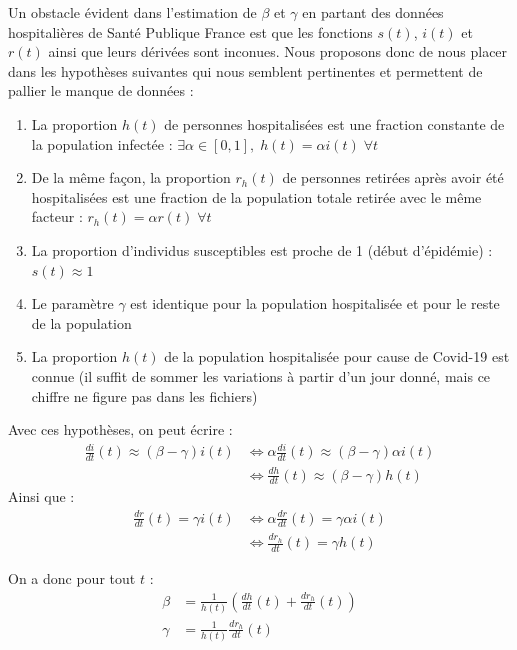 \documentclass[12pt]{extarticle}
\begin{document}
Un obstacle évident dans l'estimation de $\beta$ et $\gamma$ en partant des données hospitalières de Santé Publique France est que les fonctions $s(t)$, $i(t)$ et $r(t)$ ainsi que leurs dérivées sont inconues.
Nous proposons donc de nous placer dans les hypothèses suivantes qui nous semblent pertinentes et permettent de pallier le manque de données : 
\begin{enumerate}
    \item La proportion $h(t)$ de personnes hospitalisées est une fraction constante de la population infectée : $\exists \alpha \in [0, 1], \; h(t) = \alpha i(t) \; \forall t$
    \item De la même façon, la proportion $r_h(t)$ de personnes retirées après avoir été hospitalisées est une fraction de la population totale retirée avec le même facteur : $r_h(t) = \alpha r(t) \; \forall t$
    \item La proportion d'individus susceptibles est proche de 1 (début d'épidémie) : $s(t) \approx 1$
    \item Le paramètre $\gamma$ est identique pour la population hospitalisée et pour le reste de la population
    \item La proportion $h(t)$ de la population hospitalisée pour cause de Covid-19 est connue (il suffit de sommer les variations à partir d'un jour donné, mais ce chiffre ne figure pas dans les fichiers)
\end{enumerate}

\bigskip

Avec ces hypothèses, on peut écrire :
\begin{align*}
    \frac{di}{dt}(t) \approx (\beta - \gamma) i(t)  &\Leftrightarrow \alpha \frac{di}{dt}(t) \approx (\beta - \gamma) \alpha i(t)\\
                                                    &\Leftrightarrow \frac{dh}{dt}(t) \approx (\beta - \gamma) h(t)
\end{align*}
Ainsi que :
\begin{align*}
    \frac{dr}{dt}(t) = \gamma i(t)  &\Leftrightarrow \alpha \frac{dr}{dt}(t) = \gamma \alpha i(t)\\
                                                    &\Leftrightarrow \frac{dr_h}{dt}(t) = \gamma h(t)
\end{align*}

\bigskip

On a donc pour tout $t$ : 
\begin{align*}
    \beta &= \frac{1}{h(t)}(\frac{dh}{dt}(t) + \frac{dr_h}{dt}(t))\\
    \gamma &= \frac{1}{h(t)}\frac{dr_h}{dt}(t)
\end{align*}
\end{document}

